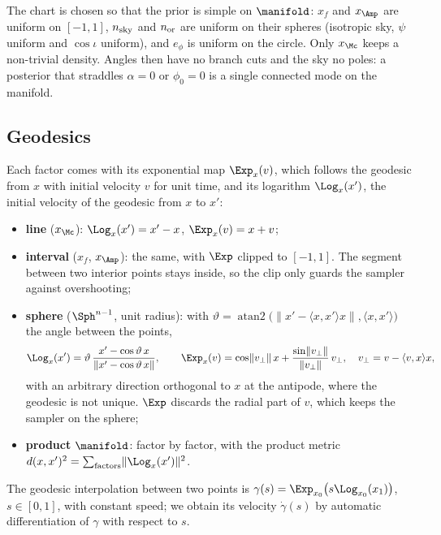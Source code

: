 The chart is chosen so that the prior is simple on $\manifold$: $x_f$ and $x_{\Amp}$ are
uniform on $[-1,1]$, $n_{\rm sky}$ and $n_{\rm or}$ are uniform on their spheres (isotropic
sky, $\psi$ uniform and $\cos\iota$ uniform), and $e_\phi$ is uniform on the circle. Only
$x_{\Mc}$ keeps a non-trivial density. Angles then have no branch cuts and the sky no poles:
a posterior that straddles $\alpha = 0$ or $\phi_0 = 0$ is a single connected mode on the
manifold.

\subsection{Geodesics}
\label{app:geometry-maps}

Each factor comes with its exponential map $\Exp_x(v)$, which follows the geodesic from $x$
with initial velocity $v$ for unit time, and its logarithm $\Log_x(x')$, the initial velocity
of the geodesic from $x$ to $x'$:
\begin{itemize}
  \item \textbf{line} ($x_{\Mc}$): $\Log_x(x') = x'-x$, $\Exp_x(v) = x+v$;
  \item \textbf{interval} ($x_f$, $x_{\Amp}$): the same, with $\Exp$ clipped to $[-1,1]$. The
        segment between two interior points stays inside, so the clip only guards the
        sampler against overshooting;
  \item \textbf{sphere} ($\Sph^{n-1}$, unit radius): with
        $\vartheta = \operatorname{atan2}\bigl(\lVert x' - \langle x,x'\rangle x\rVert,
        \langle x,x'\rangle\bigr)$ the angle between the points,
        \begin{equation}
          \Log_x(x') = \vartheta\,\frac{x' - \cos\vartheta\,x}{\lVert x' - \cos\vartheta\,x\rVert},
          \qquad
          \Exp_x(v) = \cos\lVert v_\perp\rVert\,x + \frac{\sin\lVert v_\perp\rVert}{\lVert v_\perp\rVert}\,v_\perp,
          \quad v_\perp = v - \langle v, x\rangle x,
        \end{equation}
        with an arbitrary direction orthogonal to $x$ at the antipode, where the geodesic is
        not unique. $\Exp$ discards the radial part of $v$, which keeps the sampler on the
        sphere;
  \item \textbf{product} $\manifold$: factor by factor, with the product metric
        $d(x,x')^2 = \sum_{\rm factors}\lVert\Log_x(x')\rVert^2$.
\end{itemize}
The geodesic interpolation between two points is
$\gamma(s) = \Exp_{x_0}\bigl(s\Log_{x_0}(x_1)\bigr)$, $s\in[0,1]$, with constant speed; we
obtain its velocity $\dot\gamma(s)$ by automatic differentiation of $\gamma$ with respect to $s$.

